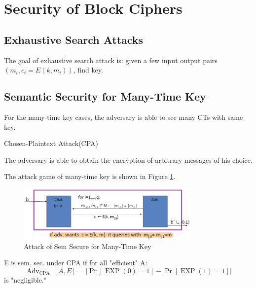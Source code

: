 \section{Security of Block Ciphers}

\subsection{Exhaustive Search Attacks}

The goal of exhaustive search attack is: given a few input output pairs $(m_i,c_i=E(k,m_i))$, find key.


\subsection{Semantic Security for Many-Time Key}

For the many-time key cases, the adversary is able to see many CTs with same key.

\begin{definition}  Chosen-Plaintext Attack(CPA)

    The adversary is able to obtain the encryption of arbitrary messages of his choice.
    
\end{definition}

The attack game of many-time key is shown in Figure \ref{fig: 03 Attack of Sem Secure for Many-Time Key}.

\begin{figure}[h]
    \centering
    \includegraphics[width=0.8\textwidth]{Stanford_Crypto_1/fig/03_block_cipher/Attack of Sem Secure for Many-Time Key.png}
    \caption{Attack of Sem Secure for Many-Time Key}
    \label{fig: 03 Attack of Sem Secure for Many-Time Key}
\end{figure}

\begin{definition} 

    E is sem. sec. under CPA if for all "efficient" A:
    $$
    \operatorname{Adv}_{\text {CPA }}[A, E]=|\operatorname{Pr}[\operatorname{EXP}(0)=1]-\operatorname{Pr}[\operatorname{EXP}(1)=1]|
    $$
    is "negligible."
    
\end{definition}

